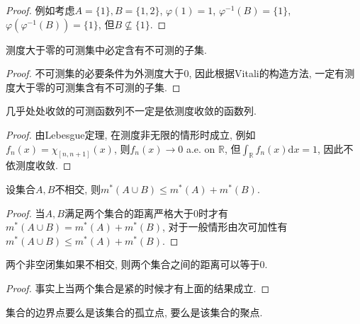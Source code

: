 \documentclass[theorem=false,mathfont=none,openany,sub3section]{easybook}
\begin{document}
\begin{proof}
  例如考虑$A=\{1\}, B=\{1,2\}$, $\varphi(1)=1$, $\varphi^{-1}(B)=\{1\}$, $\varphi(\varphi^{-1}(B))=\{1\}$, 但$B \nsubseteq \{1\}$.\par
\end{proof}

\begin{example}
  测度大于零的可测集中必定含有不可测的子集.\par
\end{example}

\begin{proof}
  不可测集的必要条件为外测度大于0, 因此根据Vitali的构造方法, 一定有测度大于零的可测集含有不可测的子集.\par
\end{proof}

\begin{example}
  几乎处处收敛的可测函数列不一定是依测度收敛的函数列.
\end{example}

\begin{proof}
  由Lebesgue定理, 在测度非无限的情形时成立, 例如$f_n(x)=\chi_{[n,n+1]}(x)$, 则$f_n(x)\rightarrow 0$ a.e. on $\mathbb{R}$, 但$\int_{\mathbb{R}}f_n(x)\mathrm{d}x=1$, 因此不依测度收敛.\par
\end{proof}

\begin{example}
  设集合$A,B$不相交, 则$m^{*}(A \cup B) \leqslant m^{*}(A) + m^{*}(B)$.
\end{example}

\begin{proof}
  当$A,B$满足两个集合的距离严格大于0时才有$m^{*}(A \cup B) = m^{*}(A) + m^{*}(B)$, 对于一般情形由次可加性有$m^{*}(A \cup B) \leqslant m^{*}(A) + m^{*}(B)$.\par
\end{proof}

\begin{example}
  两个非空闭集如果不相交, 则两个集合之间的距离可以等于0.
\end{example}

\begin{proof}
  事实上当两个集合是紧的时候才有上面的结果成立.\par
\end{proof}

\begin{example}
  集合的边界点要么是该集合的孤立点, 要么是该集合的聚点.
\end{example}
\end{document}

